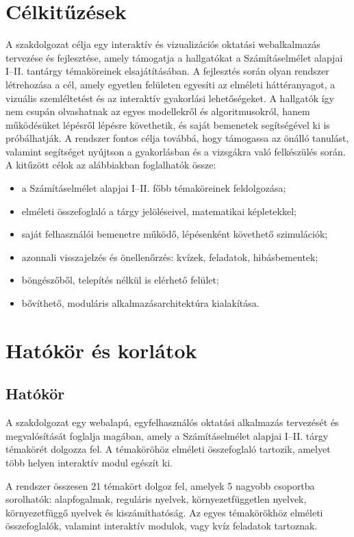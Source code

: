 \section{Célkitűzések}
A szakdolgozat célja egy interaktív és vizualizációs oktatási webalkalmazás
tervezése és fejlesztése, amely támogatja a hallgatókat a Számításelmélet
alapjai I--II. tantárgy témaköreinek elsajátításában.
A fejlesztés során olyan rendszer létrehozása a cél,
amely egyetlen felületen egyesíti az elméleti háttéranyagot, a vizuális
szemléltetést és az interaktív gyakorlási lehetőségeket. A hallgatók így
nem csupán olvashatnak az egyes modellekről és algoritmusokról, hanem
működésüket lépésről lépésre követhetik, és saját bemenetek segítségével
ki is próbálhatják.
A rendszer fontos célja továbbá, hogy támogassa az önálló tanulást,
valamint segítséget nyújtson a gyakorlásban és a vizsgákra való
felkészülés során.
A kitűzött célok az alábbiakban foglalhatók össze:

\begin{itemize}
    \item a Számításelmélet alapjai I--II. főbb témaköreinek feldolgozása;
    \item elméleti összefoglaló a tárgy jelöléseivel, matematikai képletekkel;
    \item saját felhasználói bemenetre működő, lépésenként követhető szimulációk;
    \item azonnali visszajelzés és önellenőrzés: kvízek, feladatok, hibásbementek;
    \item böngészőből, telepítés nélkül is elérhető felület;
    \item bővíthető, moduláris alkalmazásarchitektúra kialakítása.
\end{itemize}

\section{Hatókör és korlátok}

\subsection{Hatókör}

A szakdolgozat egy webalapú, egyfelhasználós oktatási alkalmazás
tervezését és megvalósítását foglalja magában, amely a Számításelmélet
alapjai I--II. tárgy témakörét dolgozza fel. A témaköröhöz elméleti összefoglaló
tartozik, amelyet több helyen interaktív modul egészít ki.

A rendszer összesen 21 témakört dolgoz fel, amelyek 5 nagyobb csoportba sorolhatók: 
alapfogalmak, reguláris nyelvek, környezetfüggetlen nyelvek, környezetfüggő nyelvek és kiszámíthatóság.
 Az egyes témakörökhöz elméleti összefoglalók, valamint interaktív modulok, vagy kvíz feladatok tartoznak.

